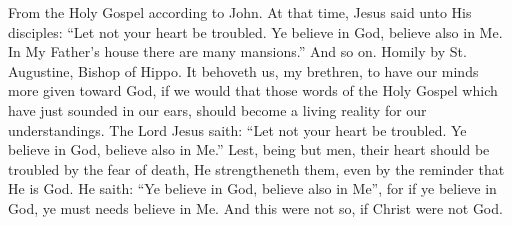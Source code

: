 From the Holy Gospel according to John.
At that time, Jesus said unto His disciples: “Let not your heart be troubled. Ye believe in God, believe also in Me. In My Father’s house there are many mansions.” And so on.
\versseparator
Homily by St. Augustine, Bishop of Hippo.
It behoveth us, my brethren, to have our minds more given toward God, if we would that those words of the Holy Gospel which have just sounded in our ears, should become a living reality for our understandings. The Lord Jesus saith: “Let not your heart be troubled. Ye believe in God, believe also in Me.” Lest, being but men, their heart should be troubled by the fear of death, He strengtheneth them, even by the reminder that He is God. He saith: “Ye believe in God, believe also in Me”, for if ye believe in God, ye must needs believe in Me. And this were not so, if Christ were not God.
